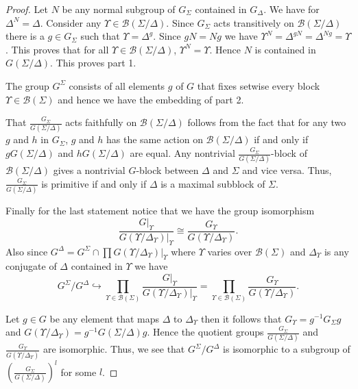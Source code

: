 \documentclass[11pt]{madras}%
\theoremstyle{remark}
\newcommand{\pr}[2]{{\ensuremath{\left.{#1}\right\vert_{#2}}}}
\newcommand{\Blocks}[1]{{\ensuremath{\mathcal{B}\left(#1\right)}}}
\newcommand{\Gof}[2][G]{{\ensuremath{#1\left(#2\right)}}}
\begin{document}
\begin{proof}

  Let $N$ be any normal subgroup of $G_\Sigma$ contained in
  $G_\Delta$.  We have for $\Delta^N = \Delta$. Consider any $\Upsilon
  \in \Blocks{\Sigma/\Delta}$. Since $G_\Sigma$ acts transitively on
  $\Blocks{\Sigma/\Delta}$ there is a $g \in G_\Sigma$ such that
  $\Upsilon = \Delta^g$. Since $gN = Ng$ we have $\Upsilon^N =
  \Delta^{gN} = \Delta^{Ng}= \Upsilon$. This proves that for all
  $\Upsilon \in \Blocks{\Sigma/\Delta}$, $\Upsilon^N = \Upsilon$.
  Hence $N$ is contained in $\Gof{\Sigma/\Delta}$. This proves part 1.

  The group $G^\Sigma$ consists of all elements $g$ of $G$ that fixes
  setwise every block $\Upsilon \in \Blocks{\Sigma}$ and hence we have
  the embedding of part 2.

  That $\frac{G_\Sigma}{\Gof{\Sigma/\Delta}}$ acts faithfully on
  $\Blocks{\Sigma/\Delta}$ follows from the fact that for any two $g$
  and $h$ in $G_\Sigma$, $g$ and $h$ has the same action on
  $\Blocks{\Sigma/\Delta}$ if and only if $g\Gof{\Sigma/\Delta}$ and
  $h\Gof{\Sigma/\Delta}$ are equal.  Any nontrivial
  $\frac{G_\Sigma}{\Gof{\Sigma/\Delta}}$-block of
  $\Blocks{\Sigma/\Delta}$ gives a nontrivial $G$-block between
  $\Delta$ and $\Sigma$ and vice versa. Thus,
  $\frac{G_\Sigma}{\Gof{\Sigma/\Delta}}$ is primitive if and only if
  $\Delta$ is a maximal subblock of $\Sigma$.

  Finally for the last statement notice that we have the group
  isomorphism
  \[
  \frac{\pr{G}{\Upsilon}}{\pr{\Gof{\Upsilon/\Delta_{\Upsilon}}}{\Upsilon}}
  \cong \frac{G_\Upsilon}{\Gof{\Upsilon/\Delta_{\Upsilon}}}.
  \]
  Also since $G^\Delta = G^\Sigma \cap \prod
  \pr{\Gof{\Upsilon/\Delta_\Upsilon}}{\Upsilon}$ where $\Upsilon$
  varies over $\Blocks{\Sigma}$ and $\Delta_\Upsilon$ is any conjugate
  of $\Delta$ contained in $\Upsilon$ we have
  \[
  G^\Sigma /G^\Delta \hookrightarrow \prod_{\Upsilon \in
    \Blocks{\Sigma}}
  \frac{\pr{G}{\Upsilon}}{\pr{\Gof{\Upsilon/\Delta_{\Upsilon}}}{\Upsilon}}
  = \prod_{\Upsilon \in \Blocks{\Sigma}}
  \frac{G_\Upsilon}{\Gof{\Upsilon/\Delta_{\Upsilon}}}.\]

  Let $g \in G$ be any element that maps $\Delta$ to
  $\Delta_{\Upsilon}$ then it follows that $G_\Upsilon = g^{-1}
  G_\Sigma g$ and $\Gof{\Upsilon/\Delta_\Upsilon} =
  g^{-1}\Gof{\Sigma/\Delta}g$. Hence the quotient groups
  $\frac{G_\Sigma}{\Gof{\Sigma/\Delta}}$ and
  $\frac{G_\Upsilon}{\Gof{\Upsilon/\Delta_\Upsilon}}$ are isomorphic.
  Thus, we see that $G^\Sigma/G^\Delta$ is isomorphic to a subgroup of
  $\left(\frac{G_\Sigma}{\Gof{\Sigma/\Delta}}\right)^l$ for some $l$.
\end{proof}
\end{document}
